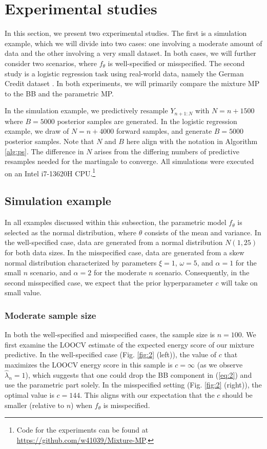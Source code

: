 \documentclass[11pt,a4paper]{article}
\theoremstyle{plain}
\theoremstyle{remark}
\theoremstyle{remark}
\begin{document}
\section{Experimental studies}
In this section,  we present two experimental studies. The first is a simulation example, which we will divide into two cases: one involving a moderate amount of data and the other involving a very small dataset. In both cases, we will further consider two scenarios, where $f_{\theta}$ is well-specified or misspecified. The second study is a logistic regression task using real-world data, namely the German Credit dataset \citep{statlog_(german_credit_data)_144}. In both experiments, we will primarily compare the mixture MP to the BB and the parametric MP.  

In the simulation example, we predictively resample $Y_{n+1:N}$ with $N=n+1500$
where $B=5000$ posterior samples are generated. In the logistic regression example, we draw of $N = n+4000$ forward samples, and generate $B=5000$ posterior samples. Note that $N$ and $B$ here align with the notation in Algorithm \ref{alg:ps}. The difference in $N$ arises from the differing numbers of predictive resamples needed for the martingale to converge. All simulations were executed on an Intel i7-13620H CPU.\footnote{Code for the experiments can be found at \url{https://github.com/w41039/Mixture-MP}.}


\subsection{Simulation example}
In all examples discussed within this subsection, the parametric model $f_\theta$ is selected as the normal distribution, {where $\theta$ consists of the mean and variance}. In the well-specified case, data are generated from a normal distribution $N(1, 25)$ for both data sizes. In the misspecified case, data are generated from a skew normal distribution characterized by parameters $\xi = 1$, $\omega = 5$, and $\alpha = 1$ for the small $n$ scenario, and $\alpha = 2$ for the moderate $n$ scenario. Consequently, in the second misspecified case, we expect that the prior hyperparameter $c$ will take on small value. 


\subsubsection{Moderate sample size}


In both the well-specified and misspecified cases, the sample size is $n = 100$. We first examine the LOOCV estimate of the expected energy score of our mixture predictive. In the well-specified case (Fig. \ref{fig:2} (left)), the value of $c$ that maximizes the LOOCV energy score in this sample is $c = \infty$ (as we observe {$\widehat{\lambda}_n = 1$}), which suggests that one could drop the BB component in (\ref{eq:2}) and use the parametric part solely. In the misspecified setting (Fig. \ref{fig:2} (right)), the optimal value is $c=144$. This aligns with our expectation that the $c$ should be smaller (relative to $n$) when $f_\theta$ is misspecified.
\end{document}
